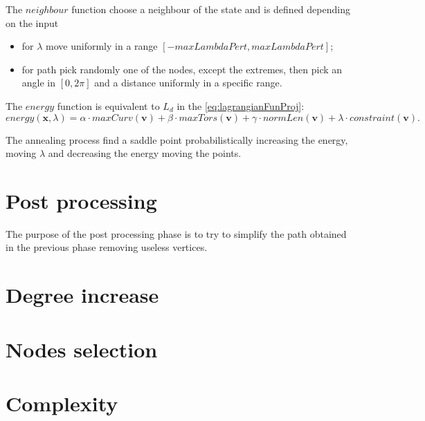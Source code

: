 \documentclass[dissertation.tex]{subfiles}
\begin{document}
The $neighbour$ function choose a neighbour of the state and is
defined depending on the input
\begin{itemize}
  \item for $\lambda$ move uniformly in a range $[-maxLambdaPert, maxLambdaPert]$;
  \item for path pick randomly one of the nodes, except the extremes,
    then pick an angle in $[0,2\pi]$ and a distance
    uniformly in a specific range.
\end{itemize}

The $energy$ function is equivalent to $L_d$ in the
\cref{eq:lagrangianFunProj}:
$$energy(\mathbf{x},\lambda)=\alpha\cdot maxCurv(\mathbf{v})+\beta\cdot
    maxTors(\mathbf{v})+\gamma\cdot normLen(\mathbf{v})+\lambda\cdot constraint(\mathbf{v}).$$

The annealing process
find a saddle point probabilistically increasing the energy, moving
$\lambda$ and 
decreasing the energy moving the points.


\section{Post processing}\label{sec:postPro}
The purpose of the post processing phase is to try to simplify the
path obtained in the previous phase removing useless vertices.
\section{Degree increase}\label{sec:degreeInc}
\section{Nodes selection}\label{sec:nodeSel}
\section{Complexity}
\end{document}
